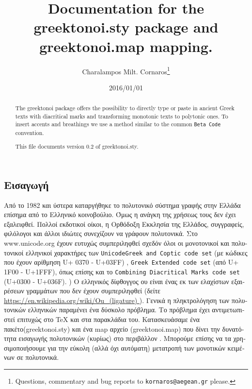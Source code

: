 \documentclass{article}
\title{Documentation for the {\sf greektonoi.sty} package and {\sf greektonoi.map} mapping.}
\author{Charalampos Milt. Cornaros\thanks{ Questions, commentary and bug reports to \texttt{kornaros@aegean.gr} please.}}
\date{2016/01/01}
\begin{document}
\maketitle
\begin{abstract}
The \textsf{greektonoi} package offers the possibility to directly type or paste in ancient Greek texts with diacritical marks and transforming monotonic texts to polytonic ones. To insert accents and breathings we use a method similar to the common \texttt{Beta Code} convention.

This file documents version 0.2 of \textsf{greektonoi.sty}.
\end{abstract}

\tableofcontents


\begin{greek}
\setcounter{section}{0}
 \section{\textgreek{Εισαγωγή}}
 
 Από το 1982 και ύστερα καταργήθηκε το πολυτονικό σύστημα γραφής στην Ελλάδα επίσημα από το Ελληνικό κοινοβούλιο. Όμως η ανάγκη της χρήσεως τους δεν έχει εξαλειφθεί. Πολλοί εκδοτικοί οίκοι, η Ορθόδοξη Εκκλησία της Ελλάδος, συγγραφείς, φιλόλογοι  και άλλοι ιδιώτες συνεχίζουν να γράφουν πολυτονικά. Στο www.unicode.org έχουν ευτυχώς συμπεριληφθεί σχεδόν όλοι οι μονοτονικοί και πολυτονικοί ελληνικοί χαρακτήρες των \texttt{UnicodeGreek and Coptic code set}  (με κώδικες που έχουν αρίθμηση U+ 0370 - U+03FF) , \texttt{Greek Extended code set} (από U+ 1F00 - U+1FFF), όπως επίσης και το \texttt{Combining Diacritical Marks code set} (U+0300 - U+036F). )  Ο ελληνικός δίφθογγος ου είναι ένας εκ των  ελαχίστων εξαιρέσεων γραμμάτων που δεν έχουν συμπεριληφθεί (δείτε
 \url{ https://en.wikipedia.org/wiki/Ou_(ligature) }
). Γενικά η πληκτρολόγηση των πολυτονικών ελληνικών παραμένει   ένα δύσκολο πρόβλημα. Το πρόβλημα έχει αντιμετωπιστεί επιτυχώς στο \TeX{} και στα παρακλάδια του. Κατασκευάσαμε ένα πακέτο({\sf greektonoi.sty}) και ένα map αρχείο ({\sf greektonoi.map}) που δίνει την δυνατότητα  εισαγωγής πολυτονικών (κυρίως) στο περιβάλλον \XeTeX. Μπορούμε επίσης να τα χρησιμοποιήσουμε για την εύκολη (αλλά όχι αυτόματη) μετατροπή των μονοτικών κειμένων σε πολυτονικά.


\end{greek}
\end{document}
